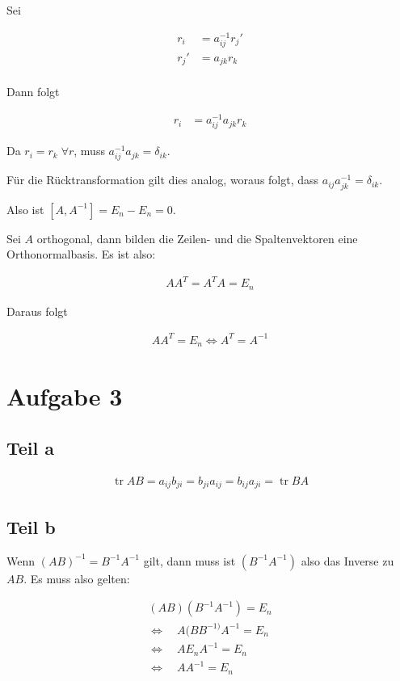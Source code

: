 \documentclass[a4paper,german,12pt,smallheadings]{scrartcl}
\DeclareMathOperator{\tr}{tr}
\begin{document}
Sei

\begin{align*}
  r_i  &= a^{-1}_{ij} r_j' \\
  r_j' &= a_{jk} r_k \\
\end{align*}

Dann folgt

\begin{align*}
   r_i  &= a^{-1}_{ij} a_{jk} r_k
\end{align*}

Da $r_i = r_k\;\forall r$, muss $a^{-1}_{ij} a_{jk} = \delta_{ik}$.

Für die Rücktransformation gilt dies analog, woraus folgt, dass $a_{ij}
a^{-1}_{jk} = \delta_{ik}$.

Also ist $[A, A^{-1}] = E_n - E_n = 0$.

Sei $A$ orthogonal, dann bilden die Zeilen- und die Spaltenvektoren eine Orthonormalbasis. Es ist also:

\begin{align*}
  AA^T = A^TA = E_n
\end{align*}

Daraus folgt

\begin{align*}
  AA^T = E_n \Leftrightarrow A^T = A^{-1}
\end{align*}

\section*{Aufgabe 3}
\subsection*{Teil a}

\begin{align*}
  \tr AB = a_{ij}b_{ji} = b_{ji}a_{ij} = b_{ij}a_{ji} = \tr BA
\end{align*}

\subsection*{Teil b}
Wenn $(AB)^{-1} = B^{-1}A^{-1}$ gilt, dann muss ist $(B^{-1}A^{-1})$ also das
Inverse zu $AB$. Es muss also gelten:

\begin{align*}
  (AB)(B^{-1}A^{-1}) = E_n \\
  \Leftrightarrow\quad A(BB^{-1)}A^{-1} = E_n \\
  \Leftrightarrow\quad AE_nA^{-1} = E_n \\
  \Leftrightarrow\quad AA^{-1} = E_n \\
\end{align*}
\end{document}
